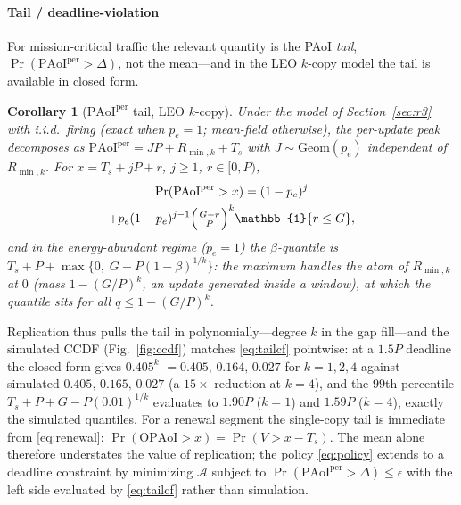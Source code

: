 \documentclass[twocolumn,3p,times,procedia]{elsarticle}
\newtheorem{corollary}{Corollary}
\newcommand{\OPAoI}{\mathrm{OPAoI}}
\newcommand{\PAoIper}{\mathrm{PAoI}^{\mathrm{per}}}
\newcommand{\ind}{\mathbb{1}}
\newcommand{\peff}{p_e}
\begin{document}
\paragraph*{Tail / deadline-violation}
For mission-critical traffic the relevant quantity is the PAoI
\emph{tail}, $\Pr(\PAoIper>\Delta)$, not the mean---and in the LEO $k$-copy
model the tail is available in closed form.

\begin{corollary}[$\PAoIper$ tail, LEO $k$-copy]\label{cor:tail}
Under the model of Section~\ref{sec:r3} with i.i.d.\ firing (exact when
$\peff=1$; mean-field otherwise), the per-update peak decomposes as
$\PAoIper=JP+R_{\min,k}+T_s$ with $J\sim\mathrm{Geom}(\peff)$ independent of
$R_{\min,k}$. For $x=T_s+jP+r$, $j\ge1$, $r\in[0,P)$,
\begin{multline}\label{eq:tailcf}
\Pr(\PAoIper>x)=(1-\peff)^{j}\\
+\peff(1-\peff)^{j-1}\Bigl(\tfrac{G-r}{P}\Bigr)^{k}\ind\{r\le G\},
\end{multline}
and in the energy-abundant regime ($\peff{=}1$) the $\beta$-quantile is
$T_s+P+\max\bigl\{0,\;G-P(1-\beta)^{1/k}\bigr\}$: the maximum handles the
atom of $R_{\min,k}$ at $0$ (mass $1-(G/P)^k$, an update generated
inside a window), at which the quantile sits for all
$q\le1-(G/P)^k$.
\end{corollary}

Replication thus pulls the tail in polynomially---degree $k$ in the gap
fill---and the simulated CCDF (Fig.~\ref{fig:ccdf}) matches
\eqref{eq:tailcf} pointwise: at a $1.5P$ deadline the closed form gives
$0.405^{k}$ $=0.405,\,0.164,\,0.027$ for $k{=}1,2,4$ against simulated
$0.405,\,0.165,\,0.027$ (a $15\times$ reduction at $k{=}4$), and the
$99$th percentile $T_s+P+G-P(0.01)^{1/k}$ evaluates to $1.90P$ ($k{=}1$)
and $1.59P$ ($k{=}4$), exactly the simulated quantiles. For a renewal
segment the single-copy tail is immediate from \eqref{eq:renewal}:
$\Pr(\OPAoI>x)=\Pr(V>x-T_s)$. The mean alone therefore understates the
value of replication; the policy \eqref{eq:policy} extends to a deadline
constraint by minimizing $\mathcal{A}$ subject to
$\Pr(\PAoIper>\Delta)\le\epsilon$ with the left side evaluated by
\eqref{eq:tailcf} rather than simulation.
\end{document}
